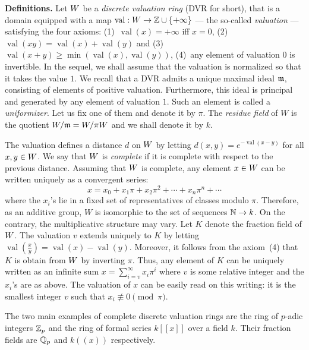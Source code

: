 \documentclass{sig-alternate}
\DeclareMathOperator{\val}{val}
\begin{document}
\noindent
\textbf{Definitions.}
Let $W$ be a \emph{discrete valuation ring} (DVR for short), that is a 
domain equipped with a map $\val : \A \to \Z \cup \{+\infty\}$ --- the 
so-called \emph{valuation} --- satisfying the four axioms: (1)~$\val(x) 
= +\infty$ iff $x = 0$, (2)~$\val(xy) = \val(x) + \val(y)$ and 
(3)~$\val(x+y) \geq \min(\val(x), \val(y))$, (4)~any element of 
valuation $0$ is invertible. In the sequel, we shall assume that the
valuation is normalized so that it takes the value $1$. We recall that a 
DVR admits a unique maximal ideal $\mathfrak m$, consisting of elements of 
positive valuation. Furthermore, this ideal is principal and generated 
by any element of valuation $1$. Such an element is called a 
\emph{uniformizer}. Let us fix one of them and denote it by $\pi$. The 
\emph{residue field} of $W$ is the quotient $W/\mathfrak m = W/\pi W$ and we 
shall denote it by $k$.

The valuation defines a distance $d$ on $W$ by letting $d(x,y) = 
e^{-\val(x-y)}$ for all $x, y \in W$. We say that $W$ is \emph{complete}
if it is complete with respect to the previous distance. Assuming that
$W$ is complete, any element $x \in W$ can be written uniquely as a 
convergent series:
\begin{equation}
\label{eq:expandCDVR}
x = x_0 + x_1 \pi + x_2 \pi^2 + \cdots + x_n \pi^n + \cdots
\end{equation}
where the $x_i$'s lie in a fixed set of representatives of classes
modulo $\pi$. Therefore, as an additive group, $W$ is isomorphic to 
the set of sequences $\mathbb N \to k$. On the contrary, the multiplicative
structure may vary.
Let $K$ denote the fraction field of $W$. The valuation $v$ extends 
uniquely to $K$ by letting $\val(\frac x y) = \val(x) - \val(y)$. 
Moreover, it follows from the axiom~(4) that $K$ is obtain from $W$ by 
inverting $\pi$. Thus, any element of $K$ can be uniquely written as an 
infinite sum $x = \sum_{i=v}^\infty x_i \pi^i$ where $v$ is some 
relative integer and the $x_i$'s are as above. The valuation of $x$ can 
be easily read on this writing: it is the smallest integer $v$ such that 
$x_i \not\equiv 0 \pmod \pi$.

The two main examples of complete discrete valuation rings are the 
ring of $p$-adic integers $\mathbb Z_p$ and the ring of formal series 
$k[[x]]$ over a field $k$. Their fraction fields are $\mathbb Q_p$ and
$k((x))$ respectively.

\medskip
\end{document}
